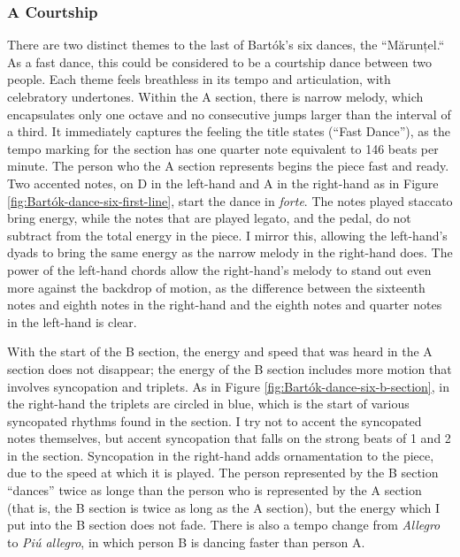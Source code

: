 \subsubsection{A Courtship}

There are two distinct themes to the last of Bartók's six dances, the ``Mărunțel.`` As a fast dance, this could be considered to be a courtship dance between two people. Each theme feels breathless in its tempo and articulation, with celebratory undertones. Within the A section, there is narrow melody, which encapsulates only one octave and no consecutive jumps larger than the interval of a third. It immediately captures the feeling the title states (``Fast Dance''), as the tempo marking for the section has one quarter note equivalent to 146 beats per minute. The person who the A section represents begins the piece fast and ready. Two accented notes, on D in the left-hand and A in the right-hand as in Figure \ref{fig:Bartók-dance-six-first-line}\autocite{Lung_2016}, start the dance in \textit{forte}. The notes played staccato bring energy, while the notes that are played legato, and the pedal, do not subtract from the total energy in the piece. I mirror this, allowing the left-hand's dyads to bring the same energy as the narrow melody in the right-hand does. The power of the left-hand chords allow the right-hand's melody to stand out even more against the backdrop of motion, as the difference between the sixteenth notes and eighth notes in the right-hand and the eighth notes and quarter notes in the left-hand is clear. 

With the start of the B section, the energy and speed that was heard in the A section does not disappear; the energy of the B section includes more motion that involves syncopation and triplets. As in Figure \ref{fig:Bartók-dance-six-b-section}\autocite{Lung_2016}, in the right-hand the triplets are circled in blue, which is the start of various syncopated rhythms found in the section. I try not to accent the syncopated notes themselves, but accent syncopation that falls on the strong beats of 1 and 2 in the section. Syncopation in the right-hand adds ornamentation to the piece, due to the speed at which it is played. The person represented by the B section ``dances'' twice as longe than the person who is represented by the A section (that is, the B section is twice as long as the A section), but the energy which I put into the B section does not fade. There is also a tempo change from \textit{Allegro} to \textit{Piú allegro}, in which person B is dancing faster than person A.